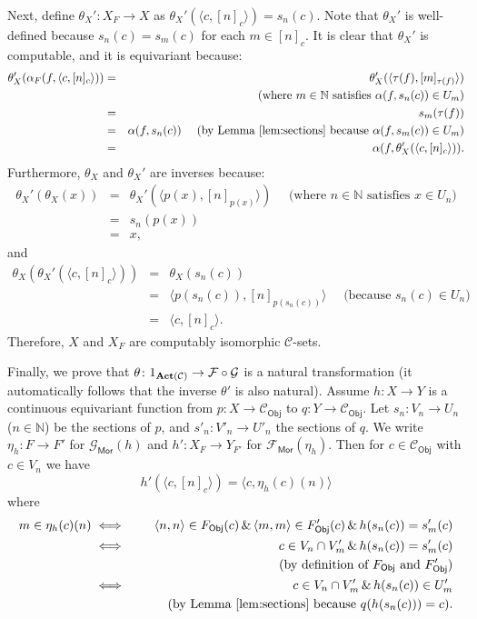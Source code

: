 \documentclass[envcountsame]{llncs}
\def\IN{{\mathbb N}}
\def\calC{{\mathcal{C}}}
\def\calF{{\mathcal{F}}}
\def\calG{{\mathcal{G}}}
\newcommand{\Mor}{\mathsf{Mor}}
\newcommand{\Obj}{\mathsf{Obj}}
\def\tar{{\tau}}
\def\act{{\mathrm{\bold{Act}}}}
\begin{document}
Next, define $\theta_X'\colon X_F \to X$ as $\theta_X'(\langle c,[n]_c\rangle) = s_n(c)$. Note that $\theta_X'$ is well-defined because $s_n(c)=s_m(c)$ for each $m\in [n]_c$. It is clear that $\theta_X'$ is computable, and it is equivariant because:
\begin{eqnarray*}
\theta_X'(\alpha_F(f,\langle c, [n]_c \rangle)) &=& \theta_X'(\langle \tar(f),[m]_{\tar(f)}\rangle)\\
&& \quad \text{ (where $m\in\IN$ satisfies $\alpha(f,s_n(c)) \in U_m$)}\\
&=& s_m(\tar(f))\\
&=& \alpha(f,s_n(c)) \quad\text{ (by Lemma~\ref{lem:sections} because $\alpha(f,s_m(c)) \in U_m$)}\\
&=& \alpha(f,\theta_X'(\langle c, [n]_c \rangle)).
\end{eqnarray*}
Furthermore, $\theta_X$ and $\theta_X'$ are inverses because:
\begin{eqnarray*}
\theta_X'(\theta_X(x)) &=& \theta_X'(\langle p(x), [n]_{p(x)} \rangle)\quad\text{ (where $n\in\IN$ satisfies $x \in U_n$)}\\
 &=& s_n(p(x))\\
 &=& x,
\end{eqnarray*}
and
\begin{eqnarray*}
\theta_X(\theta_X'(\langle c,[n]_c\rangle)) &=& \theta_X(s_n(c))\\
&=& \langle p(s_n(c)), [n]_{p(s_n(c))} \rangle\quad\text{ (because $s_n(c) \in U_n$)}\\
&=& \langle c, [n]_{c} \rangle.
\end{eqnarray*}
Therefore, $X$ and $X_F$ are computably isomorphic $\calC$-sets.

Finally, we prove that $\theta\colon 1_{\act(\calC)}\to \calF\circ\calG$ is a natural transformation (it automatically follows that the inverse $\theta'$ is also natural). Assume $h\colon X\to Y$ is a continuous equivariant function from $p\colon X\to\calC_\Obj$ to $q\colon Y\to\calC_\Obj$. Let $s_n\colon V_n \to U_n$ ($n\in\IN$) be the sections of $p$, and $s'_n\colon V'_n \to U'_n$ the sections of $q$. We write $\eta_h \colon F \to F'$ for $\calG_\Mor(h)$ and $h' \colon X_F \to Y_{F'}$ for $\calF_\Mor(\eta_h)$. Then for $c\in\calC_\Obj$ with $c\in V_n$ we have
\[h'(\langle c, [n]_c \rangle) = \langle c, \eta_h(c)(n) \rangle\]
where 
\begin{eqnarray*}
m \in \eta_h(c)(n) &\iff& \langle n,n\rangle \in  F_\Obj(c) \,\&\, \langle m,m\rangle \in  F'_\Obj(c) \,\&\, h(s_n(c)) = s'_m(c)\\
&\iff& c \in V_n \cap V'_m \,\&\, h(s_n(c)) = s'_m(c)\\
&& \qquad \text{ (by definition of $F_\Obj$ and $F'_\Obj$)}\\
&\iff& c \in V_n\cap V'_m \,\&\, h(s_n(c)) \in U'_m\\
&& \qquad \text{ (by Lemma~\ref{lem:sections} because $q(h(s_n(c))) = c$)}.
\end{eqnarray*}
\end{document}
